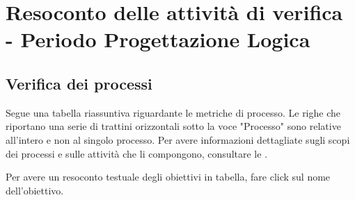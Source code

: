 \newpage

\renewcommand\VRule[1][\arrayrulewidth]{\color{black} \vrule width 2pt}

\section{Resoconto delle attività di verifica - Periodo Progettazione Logica}
\subsection{Verifica dei processi}

Segue una tabella riassuntiva riguardante le metriche di processo. Le righe che riportano una serie di trattini orizzontali sotto la voce "Processo" sono relative all'intero  e non al singolo processo.
Per avere informazioni dettagliate sugli scopi dei processi e sulle attività che li compongono, consultare le \ndpvdue.


Per avere un resoconto testuale degli obiettivi in tabella, fare click sul nome dell'obiettivo.


